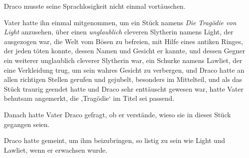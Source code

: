 Draco musste seine Sprachlosigkeit nicht einmal vortäuschen.

Vater hatte ihn einmal mitgenommen, um ein Stück namens \emph{Die Tragödie von Light} anzusehen, über einen \emph{unglaublich} cleveren Slytherin namens Light, der ausgezogen war, die Welt vom Bösen zu befreien, mit Hilfe eines antiken Ringes, der jeden töten konnte, dessen Namen und Gesicht er kannte, und dessen Gegner ein weiterer unglaublich cleverer Slytherin war, ein Schurke namens Lawliet, der eine Verkleidung trug, um sein wahres Gesicht zu verbergen, und Draco hatte an allen richtigen Stellen gerufen und gejubelt, besonders im Mittelteil, und als das Stück traurig geendet hatte und Draco sehr enttäuscht gewesen war, hatte Vater behutsam angemerkt, die ‚Tragödie‘ im Titel sei passend.

Danach hatte Vater Draco gefragt, ob er verstände, wieso sie in dieses Stück gegangen seien.

Draco hatte gemeint, um ihm beizubringen, so listig zu sein wie Light und Lawliet, wenn er erwachsen wurde.

